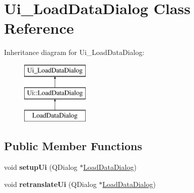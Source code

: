 \hypertarget{class_ui___load_data_dialog}{}\section{Ui\+\_\+\+Load\+Data\+Dialog Class Reference}
\label{class_ui___load_data_dialog}
Inheritance diagram for Ui\+\_\+\+Load\+Data\+Dialog\+:\begin{figure}[H]
\begin{center}
\leavevmode
\includegraphics[height=3.000000cm]{class_ui___load_data_dialog}
\end{center}
\end{figure}
\subsection*{Public Member Functions}
\begin{DoxyCompactItemize}
\item 
void {\bfseries setup\+Ui} (Q\+Dialog $\ast$\hyperlink{class_load_data_dialog}{Load\+Data\+Dialog})\hypertarget{class_ui___load_data_dialog_ac7a58ea9a15abe76d52cfeaa890c0ecb}{}\label{class_ui___load_data_dialog_ac7a58ea9a15abe76d52cfeaa890c0ecb}

\item 
void {\bfseries retranslate\+Ui} (Q\+Dialog $\ast$\hyperlink{class_load_data_dialog}{Load\+Data\+Dialog})\hypertarget{class_ui___load_data_dialog_afead0ccca4f841f6977a86069187a805}{}\label{class_ui___load_data_dialog_afead0ccca4f841f6977a86069187a805}

\end{DoxyCompactItemize}

